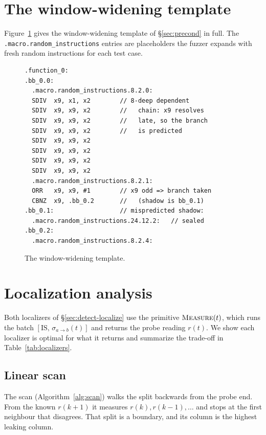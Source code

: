 \documentclass[letterpaper,twocolumn,10pt]{article}
\theoremstyle{definition}
\providecommand{\IS}{\ensuremath{\mathrm{IS}}}
\providecommand{\batch}[1]{\ensuremath{[\IS,\,#1]}}
\providecommand{\spl}[1]{\ensuremath{\sigma_{a\to b}(#1)}}
\begin{document}
\section{The window-widening template}
Figure~\ref{fig:tiktag-tmpl} gives the window-widening template of \S\ref{sec:precond} in full. The
\texttt{.macro.random\_instructions} entries are placeholders the fuzzer expands with fresh random
instructions for each test case.

\begin{figure}[H]
\centering
\begin{minipage}{0.92\linewidth}
\footnotesize
\begin{verbatim}
.function_0:
.bb_0.0:
  .macro.random_instructions.8.2.0:
  SDIV  x9, x1, x2        // 8-deep dependent
  SDIV  x9, x9, x2        //   chain: x9 resolves
  SDIV  x9, x9, x2        //   late, so the branch
  SDIV  x9, x9, x2        //   is predicted
  SDIV  x9, x9, x2
  SDIV  x9, x9, x2
  SDIV  x9, x9, x2
  SDIV  x9, x9, x2
  .macro.random_instructions.8.2.1:
  ORR   x9, x9, #1        // x9 odd => branch taken
  CBNZ  x9, .bb_0.2       //   (shadow is bb_0.1)
.bb_0.1:                  // mispredicted shadow:
  .macro.random_instructions.24.12.2:   // sealed
.bb_0.2:
  .macro.random_instructions.8.2.4:
\end{verbatim}
\end{minipage}
\caption{The window-widening template.}
\label{fig:tiktag-tmpl}
\end{figure}

\section{Localization analysis}
\label{app:localize}

Both localizers of \S\ref{sec:detect-localize} use the primitive $\textsc{Measure}(t)$,
which runs the batch $\batch{\spl{t}}$ and returns the probe reading $r(t)$. We show each localizer is optimal for what it returns
and summarize the trade-off in Table~\ref{tab:localizers}.

\subsection{Linear scan}
\label{app:scan}
The scan (Algorithm~\ref{alg:scan}) walks the split backwards from the probe end. From
the known $r(k+1)$ it measures $r(k),r(k-1),\dots$ and stops at the first neighbour that
disagrees. That split is a boundary, and its column is the highest leaking column.
\end{document}
